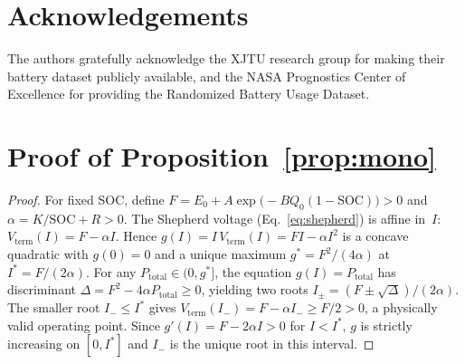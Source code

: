 \documentclass[5p,times,number]{elsarticle}
\newcommand{\propref}[1]{\hyperref[#1]{\textup{Proposition~\ref*{#1}}}}
\newcommand{\eqnrefp}[1]{\hyperref[#1]{\textup{Eq.~\ref*{#1}}}}
\def\propref#1{Proposition~\ref{#1}}
\def\eqnrefp#1{Eq.~\ref{#1}}
\begin{document}
\section*{Acknowledgements}
The authors gratefully acknowledge the XJTU research group for making their battery dataset publicly available, and the NASA Prognostics Center of Excellence for providing the Randomized Battery Usage Dataset.

\appendix
\section{Proof of \propref{prop:mono}}\label{app:proof}
\begin{proof}
For fixed SOC, define $F = E_0 + A\exp\!\bigl(-BQ_0(1-\mathrm{SOC})\bigr) > 0$ and $\alpha = K/\mathrm{SOC} + R > 0$.
The Shepherd voltage (\eqnrefp{eq:shepherd}) is affine in~$I$: $V_{\mathrm{term}}(I) = F - \alpha I$.
Hence $g(I) = I\,V_{\mathrm{term}}(I) = FI - \alpha I^2$ is a concave quadratic with $g(0) = 0$ and a unique maximum $g^* = F^2/(4\alpha)$ at $I^* = F/(2\alpha)$.
For any $P_{\mathrm{total}} \in (0, g^*]$, the equation $g(I) = P_{\mathrm{total}}$ has discriminant $\Delta = F^2 - 4\alpha P_{\mathrm{total}} \ge 0$, yielding two roots $I_{\pm} = (F \pm \sqrt{\Delta})/(2\alpha)$.
The smaller root $I_- \le I^*$ gives $V_{\mathrm{term}}(I_-) = F - \alpha I_- \ge F/2 > 0$, a physically valid operating point.
Since $g'(I) = F - 2\alpha I > 0$ for $I < I^*$, $g$ is strictly increasing on $[0, I^*]$ and $I_-$ is the unique root in this interval.
\end{proof}



\end{document}
